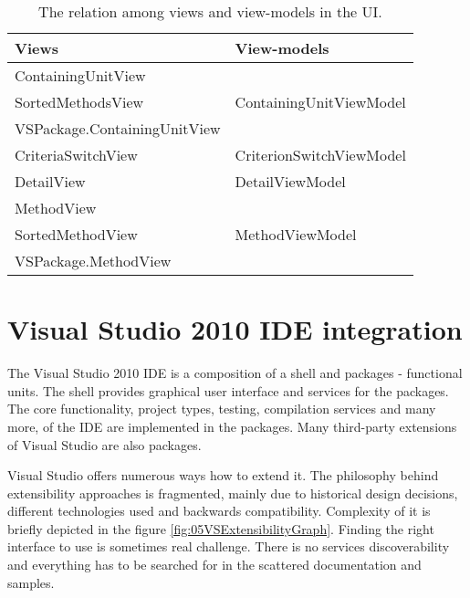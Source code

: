 \begin{table}
\centering
    \begin{tabular}{|l|l|}
        \hline
        \textbf{Views}                                                      & \textbf{View-models }    \\ \hline
        ContainingUnitView 													&       				   \\ 
        SortedMethodsView 													& ContainingUnitViewModel  \\ 
        VSPackage.ContainingUnitView 										&   					   \\ \hline
        CriteriaSwitchView                                                  & CriterionSwitchViewModel \\ \hline
        DetailView                                                          & DetailViewModel          \\ \hline
        MethodView										                    &                          \\
        SortedMethodView								                    & MethodViewModel          \\
        VSPackage.MethodView                                                &                          \\ \hline
    \end{tabular}
    \caption{The relation among views and view-models in the UI.}
   	\label{tab:05viewviewmodels}
    	
\end{table}


\section{Visual Studio 2010 IDE integration}
The Visual Studio 2010 IDE is a composition of a shell and packages - functional units. The shell provides graphical user interface and services for the packages. The core functionality, project types, testing, compilation services and many more, of the IDE are implemented in the packages. Many third-party extensions of Visual Studio are also packages.

Visual Studio offers numerous ways how to extend it. The philosophy behind extensibility approaches is fragmented, mainly due to historical design decisions, different technologies used and backwards compatibility. Complexity of it is briefly depicted in the figure \ref{fig:05VSExtensibilityGraph}. Finding the right interface to use is sometimes real challenge. There is no services discoverability and everything has to be searched for in the scattered documentation and samples.



